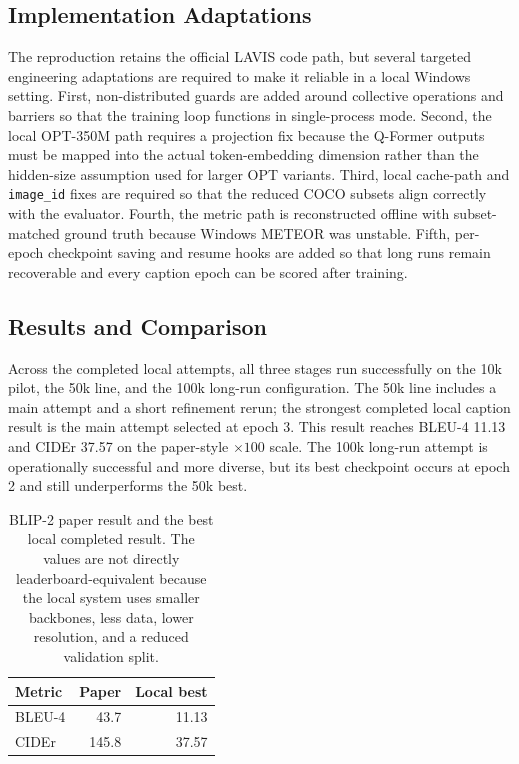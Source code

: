 \documentclass[11pt]{article}
\begin{document}
\subsection{Implementation Adaptations}
The reproduction retains the official LAVIS code path, but several targeted engineering
adaptations are required to make it reliable in a local Windows setting. First,
non-distributed guards are added around collective operations and barriers so that the
training loop functions in single-process mode. Second, the local OPT-350M path
requires a projection fix because the Q-Former outputs must be mapped into the actual
token-embedding dimension rather than the hidden-size assumption used for larger OPT
variants. Third, local cache-path and \texttt{image\_id} fixes are required so that the
reduced COCO subsets align correctly with the evaluator. Fourth, the metric path is
reconstructed offline with subset-matched ground truth because Windows METEOR was
unstable. Fifth, per-epoch checkpoint saving and resume hooks are added so that long
runs remain recoverable and every caption epoch can be scored after training.

\subsection{Results and Comparison}
Across the completed local attempts, all three stages run successfully on the 10k
pilot, the 50k line, and the 100k long-run configuration. The 50k line includes a
main attempt and a short refinement rerun; the strongest completed local caption result
is the main attempt selected at epoch 3. This result reaches BLEU-4 11.13 and CIDEr
37.57 on the paper-style $\times 100$ scale. The 100k long-run attempt is
operationally successful and more diverse, but its best checkpoint occurs at epoch 2
and still underperforms the 50k best.

\begin{table}[H]
\centering
\small
\begin{tabular}{lrr}
\toprule
Metric & Paper & Local best \\
\midrule
BLEU-4 & 43.7 & 11.13 \\
CIDEr & 145.8 & 37.57 \\
\bottomrule
\end{tabular}
\caption{BLIP-2 paper result and the best local completed result. The values are not
directly leaderboard-equivalent because the local system uses smaller backbones, less
data, lower resolution, and a reduced validation split.}
\label{tab:paper-vs-local-v2}
\end{table}
\end{document}
